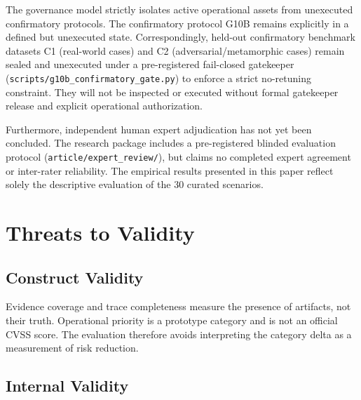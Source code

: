 \documentclass[conference]{IEEEtran}
\begin{document}
The governance model strictly isolates active operational assets from unexecuted
confirmatory protocols. The confirmatory protocol G10B remains explicitly in a
defined but unexecuted state. Correspondingly, held-out confirmatory benchmark
datasets C1 (real-world cases) and C2 (adversarial/metamorphic cases) remain
sealed and unexecuted under a pre-registered fail-closed gatekeeper
(\texttt{scripts/g10b\_confirmatory\_gate.py}) to enforce a strict no-retuning
constraint. They will not be inspected or executed without formal gatekeeper
release and explicit operational authorization.

Furthermore, independent human expert adjudication has not yet been concluded. The research
package includes a pre-registered blinded evaluation protocol (\texttt{article/expert\_review/}),
but claims no completed expert agreement or inter-rater reliability. The empirical results
presented in this paper reflect solely the descriptive evaluation of the 30 curated scenarios.

\section{Threats to Validity}

\subsection{Construct Validity}

Evidence coverage and trace completeness measure the presence of artifacts,
not their truth. Operational priority is a prototype category and is not an
official CVSS score. The evaluation therefore avoids interpreting the category
delta as a measurement of risk reduction.

\subsection{Internal Validity}
\end{document}
